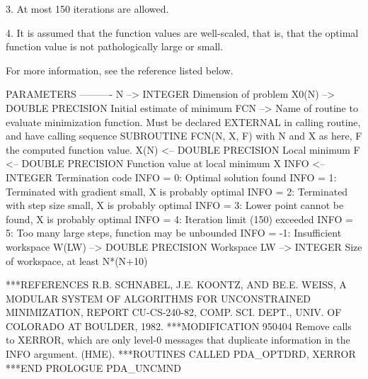\documentclass[11pt,twoside,nolof]{starlink}
\begin{document}
\begin{terminalv}
     3.  At most 150 iterations are allowed.

     4.  It is assumed that the function values are well-scaled,
     that is, that the optimal function value is not pathologically
     large or small.

     For more information, see the reference listed below.

 PARAMETERS
 ----------
 N            --> INTEGER
                  Dimension of problem
 X0(N)        --> DOUBLE PRECISION
                  Initial estimate of minimum
 FCN          --> Name of routine to evaluate minimization function.
                  Must be declared EXTERNAL in calling routine, and
                  have calling sequence
                      SUBROUTINE FCN(N, X, F)
                  with N and X as here, F the computed function value.
 X(N)        <--  DOUBLE PRECISION
                  Local minimum
 F           <--  DOUBLE PRECISION
                  Function value at local minimum X
 INFO        <--  INTEGER
                  Termination code
                      INFO =  0:  Optimal solution found
                      INFO =  1:  Terminated with gradient small,
                                  X is probably optimal
                      INFO =  2:  Terminated with step size small,
                                  X is probably optimal
                      INFO =  3:  Lower point cannot be found,
                                  X is probably optimal
                      INFO =  4:  Iteration limit (150) exceeded
                      INFO =  5:  Too many large steps,
                                  function may be unbounded
                      INFO = -1:  Insufficient workspace
 W(LW)        --> DOUBLE PRECISION
                  Workspace
 LW           --> INTEGER
                  Size of workspace, at least N*(N+10)

***REFERENCES  R.B. SCHNABEL, J.E. KOONTZ, AND BE.E. WEISS, A MODULAR
                 SYSTEM OF ALGORITHMS FOR UNCONSTRAINED MINIMIZATION,
                 REPORT CU-CS-240-82, COMP. SCI. DEPT., UNIV. OF
                 COLORADO AT BOULDER, 1982.
***MODIFICATION
   950404 Remove calls to XERROR, which are only level-0 messages that
          duplicate information in the INFO argument.  (HME).
***ROUTINES CALLED  PDA_OPTDRD, XERROR
***END PROLOGUE  PDA_UNCMND
\end{terminalv}
\end{document}
